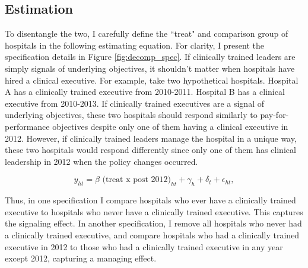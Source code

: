 \documentclass[12pt]{article}
\begin{document}
     \subsection{Estimation}

    To disentangle the two, I carefully define the ``treat" and comparison group of hospitals in the following estimating equation. For clarity, I present the specification details in Figure \ref{fig:decomp_spec}. If clinically trained leaders are simply signals of underlying objectives, it shouldn't matter when hospitals have hired a clinical executive. For example, take two hypothetical hospitals. Hospital A has a clinically trained executive from 2010-2011. Hospital B has a clinical executive from 2010-2013. If clinically trained executives are a signal of underlying objectives, these two hospitals should respond similarly to pay-for-performance objectives despite only one of them having a clinical executive in 2012. However, if clinically trained leaders manage the hospital in a unique way, these two hospitals would respond differently since only one of them has clinical leadership in 2012 when the policy changes occurred. 

    \begin{equation}
    \label{eq:decomp}
    y_{ht} = \beta \text{ (treat x post 2012)}_{ht} + \gamma_{h} + \delta_t + \epsilon_{ht},
    \end{equation}

    Thus, in one specification I compare hospitals who ever have a clinically trained executive to hospitals who never have a clinically trained executive. This captures the signaling effect. In another specification, I remove all hospitals who never had a clinically trained executive, and compare hospitals who had a clinically trained executive in 2012 to those who had a clinically trained executive in any year except 2012, capturing a managing effect. 
    
\end{document}
